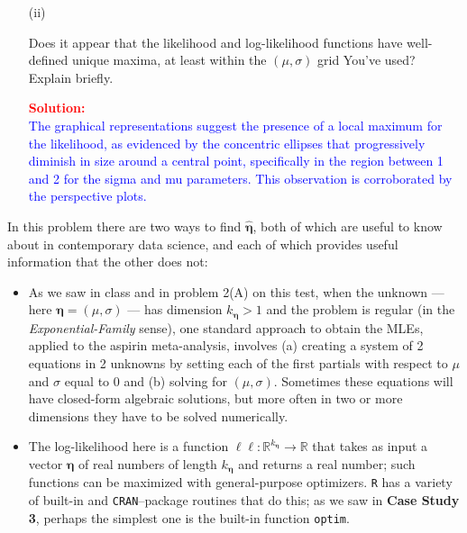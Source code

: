 \documentclass[12pt]{article}
\renewcommand{\b}[1]{\textbf{#1}}
\begin{document}
\begin{itemize}
\begin{itemize}
\item[(ii)]

Does it appear that the likelihood and log-likelihood functions have well-defined unique maxima, at least within the $( \mu, \sigma )$ grid You've used?  Explain briefly. \textit{\fbox{\textbf{[10 points]}}}

\textcolor{red}{\textbf{Solution:}} \\
\textcolor{blue}{
The graphical representations suggest the presence of a local maximum for the likelihood, as evidenced by the concentric ellipses that progressively diminish in size around a central point, specifically in the region between 1 and 2 for the sigma and mu parameters. This observation is corroborated by the perspective plots.
}
\end{itemize}

\end{itemize}

In this problem there are two ways to find $\hat{ \bm{ \eta } }$, both of which are useful to know about in contemporary data science, and each of which provides useful information that the other does not:

\begin{itemize}

\item

As we saw in class and in problem 2(A) on this test, when the unknown --- here 
$\bm{ \eta } = ( \mu, \sigma )$ --- has dimension $k_{ \bm{ \eta } } > 1$ and the problem is regular (in the \textit{Exponential-Family} sense), one standard approach to obtain the MLEs, applied to the aspirin meta-analysis, involves (a) creating a system of 2 equations in 2 unknowns by setting each of the first partials with respect to $\mu$ and $\sigma$ equal to 0 and (b) solving for $( \mu, \sigma )$. Sometimes these equations will have closed-form algebraic solutions, but more often in two or more dimensions they have to be solved numerically.

\item

The log-likelihood here is a function $\ell \ell \! \! : \mathbb{ R }^{ k_{ \bm{ \eta }  } } \rightarrow \mathbb{ R }$ that takes as input a vector $\bm{ \eta }$ of real numbers of length $k_{ \bm{ \eta } }$ and returns a real number; such functions can be maximized with general-purpose optimizers. \texttt{R} has a variety of built-in and \texttt{CRAN}--package routines that do this; as we saw in \b{Case Study 3}, perhaps the simplest one is the built-in function \texttt{optim}.

\end{itemize}
\end{document}
